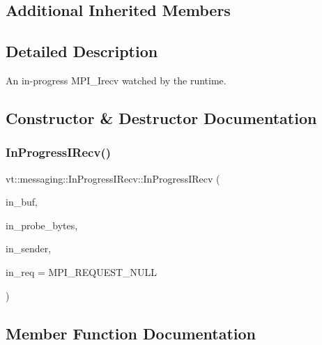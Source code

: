 \subsection*{Additional Inherited Members}


\subsection{Detailed Description}
An in-\/progress M\+P\+I\+\_\+\+Irecv watched by the runtime. 

\subsection{Constructor \& Destructor Documentation}
\mbox{\label{structvt_1_1messaging_1_1_in_progress_i_recv_ad581d8dc4f7eb82bf0f7194b6db0fed6}} 
\subsubsection{\texorpdfstring{In\+Progress\+I\+Recv()}{InProgressIRecv()}}
{\footnotesize\ttfamily vt\+::messaging\+::\+In\+Progress\+I\+Recv\+::\+In\+Progress\+I\+Recv (\begin{DoxyParamCaption}\item[{char $\ast$}]{in\+\_\+buf,  }\item[{\hyperlink{namespacevt_a408e86a8c7c89309b52907dc5a513924}{Msg\+Size\+Type}}]{in\+\_\+probe\+\_\+bytes,  }\item[{\hyperlink{namespacevt_a866da9d0efc19c0a1ce79e9e492f47e2}{Node\+Type}}]{in\+\_\+sender,  }\item[{M\+P\+I\+\_\+\+Request}]{in\+\_\+req = {\ttfamily MPI\+\_\+REQUEST\+\_\+NULL} }\end{DoxyParamCaption})\hspace{0.3cm}{\ttfamily [inline]}}



\subsection{Member Function Documentation}
\mbox{\label{structvt_1_1messaging_1_1_in_progress_i_recv_ac5cabd7a87cc7c75d6870a2597c50a8c}} 
